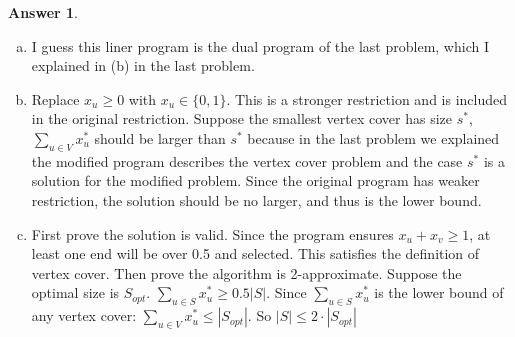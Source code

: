 \documentclass{article}
\theoremstyle{definition}
\newtheorem{ans}{Answer}
\begin{document}
	\begin{ans}
		~
		
		\begin{enumerate}[(a)]
			\item I guess this liner program is the dual program of the last problem, which I explained in (b) in the last problem. 
			
			\item Replace $x_u\geq 0$ with $x_u \in \{0,1\}$. This is a stronger restriction and is included in the original restriction. Suppose the smallest vertex cover has size $s^*$, $\underset{u\in V}{\sum}x_u^{*}$ should be larger than $s^*$ because in the last problem we explained the modified program describes the vertex cover problem and the case $s^*$ is a solution for the modified problem. Since the original program has weaker restriction, the solution should be no larger, and thus is the lower bound. 
			
			\item First prove the solution is valid. Since the program ensures $x_{u}+x_{v} \geq 1$, at least one end will be over 0.5 and selected. This satisfies the definition of vertex cover. Then prove the algorithm is 2-approximate. Suppose the optimal size is $S_{opt}$. $\underset{u \in S}{\sum} x_u^* \geq 0.5 |S|$. Since $\underset{u \in S}{\sum} x_u^*$ is the lower bound of any vertex cover: $\sum_{u \in V} x_u^*\leq |S_{opt}|$. So $|S| \leq 2 \cdot |S_{opt}|$
		\end{enumerate}
	\end{ans}
	
\end{document}
